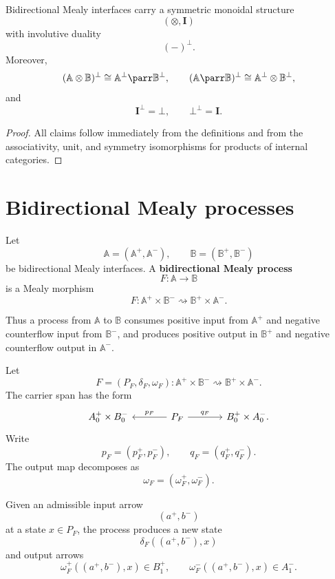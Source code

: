 \begin{proposition}
\label{prop:interface-level-linear-structure}
Bidirectional Mealy interfaces carry a symmetric monoidal structure
\[
(\otimes,\mathbf I)
\]
with involutive duality
\[
(-)^\bot.
\]
Moreover,
\[
(\mathbb A\otimes\mathbb B)^\bot
\cong
\mathbb A^\bot\parr\mathbb B^\bot,
\qquad
(\mathbb A\parr\mathbb B)^\bot
\cong
\mathbb A^\bot\otimes\mathbb B^\bot,
\]
and
\[
\mathbf I^\bot=\bot,
\qquad
\bot^\bot=\mathbf I.
\]
\end{proposition}

\begin{proof}
All claims follow immediately from the definitions and from the associativity,
unit, and symmetry isomorphisms for products of internal categories.
\end{proof}

\section{Bidirectional Mealy processes}
\label{sec:bidirectional-mealy-processes}

\begin{definition}
\label{def:bidirectional-mealy-process}
Let
\[
\mathbb A=(\mathbb A^+,\mathbb A^-),
\qquad
\mathbb B=(\mathbb B^+,\mathbb B^-)
\]
be bidirectional Mealy interfaces.  A \textbf{bidirectional Mealy process}
\[
F:\mathbb A\to\mathbb B
\]
is a Mealy morphism
\[
F:
\mathbb A^+\times\mathbb B^-
\rightsquigarrow
\mathbb B^+\times\mathbb A^-.
\]
\end{definition}

Thus a process from \(\mathbb A\) to \(\mathbb B\) consumes positive input
from \(\mathbb A^+\) and negative counterflow input from \(\mathbb B^-\), and
produces positive output in \(\mathbb B^+\) and negative counterflow output in
\(\mathbb A^-\).

Let
\[
F=(P_F,\delta_F,\omega_F):
\mathbb A^+\times\mathbb B^-
\rightsquigarrow
\mathbb B^+\times\mathbb A^-.
\]
The carrier span has the form
\[
\begin{tikzcd}[column sep=large]
A_0^+\times B_0^-
&
P_F
  \arrow[l, "p_F"']
  \arrow[r, "q_F"]
&
B_0^+\times A_0^- .
\end{tikzcd}
\]
Write
\[
p_F=(p_F^+,p_F^-),
\qquad
q_F=(q_F^+,q_F^-).
\]
The output map decomposes as
\[
\omega_F=(\omega_F^+,\omega_F^-).
\]

Given an admissible input arrow
\[
(a^+,b^-)
\]
at a state \(x\in P_F\), the process produces a new state
\[
\delta_F((a^+,b^-),x)
\]
and output arrows
\[
\omega_F^+((a^+,b^-),x)\in B_1^+,
\qquad
\omega_F^-((a^+,b^-),x)\in A_1^-.
\]

